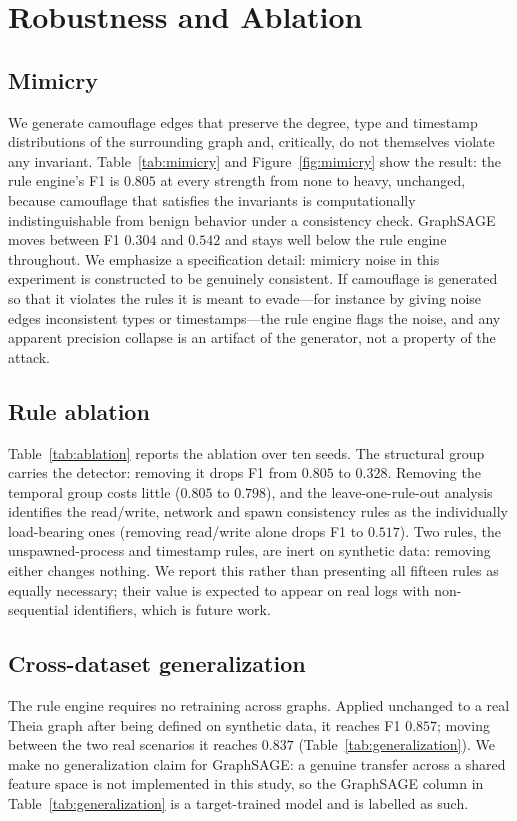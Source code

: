 \documentclass[conference]{IEEEtran}
\begin{document}
\section{Robustness and Ablation}
\label{sec:robust}
\subsection{Mimicry}
We generate camouflage edges that preserve the degree, type and timestamp
distributions of the surrounding graph and, critically, do not themselves
violate any invariant. Table~\ref{tab:mimicry} and Figure~\ref{fig:mimicry}
show the result: the rule engine's F1 is $0.805$ at every strength from none to
heavy, unchanged, because camouflage that satisfies the invariants is
computationally indistinguishable from benign behavior under a consistency
check. GraphSAGE moves between F1 $0.304$ and $0.542$ and stays well below the
rule engine throughout. We emphasize a specification detail: mimicry noise in
this experiment is constructed to be genuinely consistent. If camouflage is
generated so that it violates the rules it is meant to evade---for instance by
giving noise edges inconsistent types or timestamps---the rule engine flags the
noise, and any apparent precision collapse is an artifact of the generator, not
a property of the attack.

\subsection{Rule ablation}
Table~\ref{tab:ablation} reports the ablation over ten seeds. The structural
group carries the detector: removing it drops F1 from $0.805$ to $0.328$.
Removing the temporal group costs little ($0.805$ to $0.798$), and the
leave-one-rule-out analysis identifies the read/write, network and spawn
consistency rules as the individually load-bearing ones (removing read/write
alone drops F1 to $0.517$). Two rules, the unspawned-process and timestamp
rules, are inert on synthetic data: removing either changes nothing. We report
this rather than presenting all fifteen rules as equally necessary; their value
is expected to appear on real logs with non-sequential identifiers, which is
future work.

\subsection{Cross-dataset generalization}
The rule engine requires no retraining across graphs. Applied unchanged to a
real Theia graph after being defined on synthetic data, it reaches F1 $0.857$;
moving between the two real scenarios it reaches $0.837$ (Table~\ref{tab:generalization}).
We make no generalization claim for GraphSAGE: a genuine transfer across a
shared feature space is not implemented in this study, so the GraphSAGE column
in Table~\ref{tab:generalization} is a target-trained model and is labelled as such.
\end{document}
